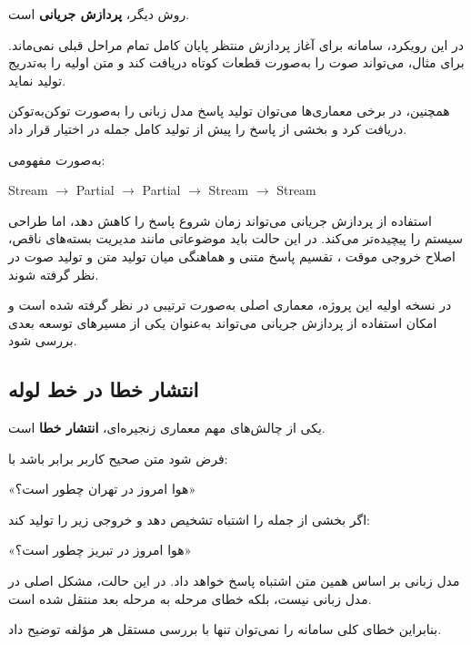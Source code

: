 روش دیگر،
\textbf{پردازش جریانی}
است.

در این رویکرد، سامانه برای آغاز پردازش منتظر پایان کامل تمام
مراحل قبلی نمی‌ماند.
برای مثال،  می‌تواند صوت را به‌صورت قطعات کوتاه دریافت کند
و متن اولیه را به‌تدریج تولید نماید.

همچنین، در برخی معماری‌ها می‌توان تولید پاسخ مدل زبانی را
به‌صورت توکن‌به‌توکن دریافت کرد و بخشی از پاسخ را پیش از
تولید کامل جمله در اختیار  قرار داد.

به‌صورت مفهومی:

\begin{center}
 Stream
$\longrightarrow$
Partial 
$\longrightarrow$
Partial 
$\longrightarrow$
 Stream
$\longrightarrow$
 Stream
\end{center}

استفاده از پردازش جریانی می‌تواند زمان شروع پاسخ را کاهش دهد،
اما طراحی سیستم را پیچیده‌تر می‌کند.
در این حالت باید موضوعاتی مانند مدیریت بسته‌های ناقص،
اصلاح خروجی موقت ، تقسیم پاسخ متنی و هماهنگی میان
تولید متن و تولید صوت در نظر گرفته شوند.

در نسخه اولیه این پروژه، معماری اصلی به‌صورت ترتیبی در نظر
گرفته شده است و امکان استفاده از پردازش جریانی می‌تواند به‌عنوان
یکی از مسیرهای توسعه بعدی بررسی شود.


\subsection{انتشار خطا در خط لوله}

یکی از چالش‌های مهم معماری زنجیره‌ای،
\textbf{انتشار خطا}
است.

فرض شود متن صحیح کاربر برابر باشد با:

\begin{center}
«هوا امروز در تهران چطور است؟»
\end{center}

اگر  بخشی از جمله را اشتباه تشخیص دهد و خروجی زیر را تولید کند:

\begin{center}
«هوا امروز در تبریز چطور است؟»
\end{center}

مدل زبانی بر اساس همین متن اشتباه پاسخ خواهد داد.
در این حالت، مشکل اصلی در مدل زبانی نیست، بلکه خطای مرحله 
به مرحله بعد منتقل شده است.

بنابراین خطای کلی سامانه را نمی‌توان تنها با بررسی مستقل
هر مؤلفه توضیح داد.

